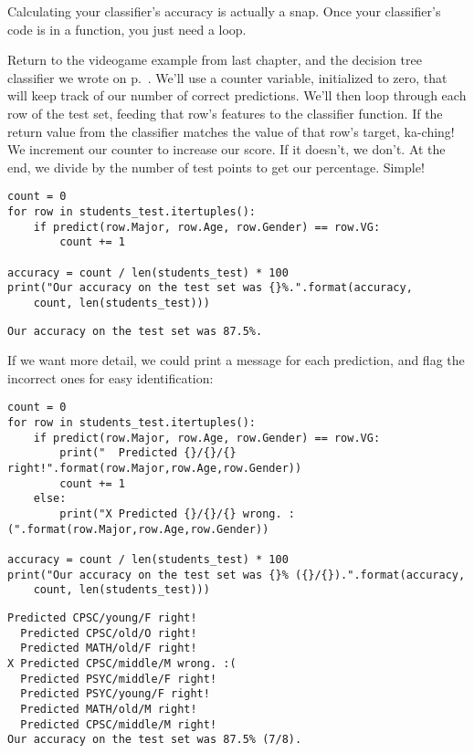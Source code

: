 Calculating your classifier's accuracy is actually a snap. Once your
classifier's code is in a function, you just need a loop.

Return to the videogame example from last chapter, and the decision tree
classifier we wrote on p.~\pageref{fig:completeVgTreePython}. We'll use a
counter variable, initialized to zero, that will keep track of our number of
correct predictions. We'll then loop through each row of the test set, feeding
that row's features to the classifier function. If the return value from the
classifier matches the value of that row's target, ka-ching! We increment our
counter to increase our score. If it doesn't, we don't. At the end, we divide
by the number of test points to get our percentage. Simple!

\begin{Verbatim}[fontsize=\small,samepage=true,frame=single,framesep=3mm]
count = 0
for row in students_test.itertuples():
    if predict(row.Major, row.Age, row.Gender) == row.VG:
        count += 1

accuracy = count / len(students_test) * 100
print("Our accuracy on the test set was {}%.".format(accuracy,
    count, len(students_test)))
\end{Verbatim}
\vspace{-.2in}

\begin{Verbatim}[fontsize=\small,samepage=true,frame=leftline,framesep=5mm,framerule=1mm]
Our accuracy on the test set was 87.5%.
\end{Verbatim}

If we want more detail, we could print a message for each prediction, and flag
the incorrect ones for easy identification:

\begin{Verbatim}[fontsize=\scriptsize,samepage=true,frame=single,framesep=3mm]
count = 0
for row in students_test.itertuples():
    if predict(row.Major, row.Age, row.Gender) == row.VG:
        print("  Predicted {}/{}/{} right!".format(row.Major,row.Age,row.Gender))
        count += 1
    else:
        print("X Predicted {}/{}/{} wrong. :(".format(row.Major,row.Age,row.Gender))

accuracy = count / len(students_test) * 100
print("Our accuracy on the test set was {}% ({}/{}).".format(accuracy,
    count, len(students_test)))
\end{Verbatim}
\vspace{-.2in}

\begin{Verbatim}[fontsize=\small,samepage=true,frame=leftline,framesep=5mm,framerule=1mm]
  Predicted CPSC/young/F right!
  Predicted CPSC/old/O right!
  Predicted MATH/old/F right!
X Predicted CPSC/middle/M wrong. :(
  Predicted PSYC/middle/F right!
  Predicted PSYC/young/F right!
  Predicted MATH/old/M right!
  Predicted CPSC/middle/M right!
Our accuracy on the test set was 87.5% (7/8).
\end{Verbatim}

